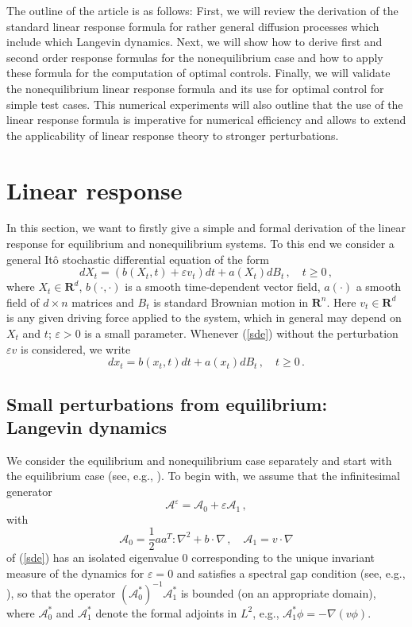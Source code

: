 \documentclass[]{tMPH2e}
\newcommand{\R}{{\mathbf R}}
\newcommand{\eps}{\varepsilon}
\newcommand{\fwg}{{\mathcal A}}
\newcommand{\cA}{\mathcal A}
\begin{document}
The outline of the article is as follows: First, we will review the derivation of the standard linear response formula for  rather general diffusion processes which include which Langevin dynamics. Next, we will show how to derive first and second order response formulas for the nonequilibrium case and how to apply these formula for the computation of optimal controls. Finally, we will validate the nonequilibrium linear response formula and its use for optimal control for simple test cases. This numerical experiments will also outline that the use of the linear response formula is imperative for numerical efficiency and allows to extend the applicability of linear response theory to stronger perturbations. 


 

\section{Linear response}


In this section, we want to firstly give a simple and formal derivation of the linear response for equilibrium and nonequilibrium systems. To this end we consider a general It\^o stochastic differential equation of the form
\begin{equation}\label{sde}
dX_{t} = (b(X_{t},t) + \eps v_{t})dt +a(X_{t})dB_{t}\,,\quad t\ge 0\,,
\end{equation}
where $X_{t}\in\R^{d}$, $b(\cdot,\cdot)$ is a smooth time-dependent vector field, $a(\cdot)$ a smooth field of $d\times n$ matrices and $B_{t}$ is standard Brownian motion in $\R^{n}$. Here $v_{t}\in\R^{d}$ is any given driving force applied to the system, which in general may depend on $X_{t}$ and $t$; $\eps>0$ is a small parameter. Whenever (\ref{sde}) without the perturbation $\eps v$ is considered, we write
\begin{equation}\label{sdewo}
dx_{t} = b(x_{t},t)dt +a(x_{t})dB_{t}\,,\quad t\ge 0\,. 
\end{equation}


  




\subsection{Small perturbations from equilibrium: Langevin dynamics}

We consider the equilibrium and nonequilibrium case separately and start with the equilibrium case (see, e.g., \cite{kubo1957,tuckeman2010statistical}). To begin with, we assume that the infinitesimal generator
\[
\fwg^{\eps} = \fwg_{0} + \eps\fwg_{1}\,, 
\]
with 
\[
\fwg_{0} = \frac{1}{2}aa^{T}\colon\nabla^{2} + b\cdot\nabla\,,\quad \fwg_{1}=v\cdot\nabla 
\]
of (\ref{sde}) has an isolated eigenvalue 0 corresponding to the unique invariant measure of the dynamics for $\eps=0$ and satisfies a spectral gap condition (see, e.g., \cite{stoltz2012}), so that the operator $(\fwg_{0}^{*})^{-1}\fwg_{1}^{*}$ is bounded (on an appropriate domain), where $\cA_{0}^{*}$ and $\cA_{1}^{*}$ denote the formal adjoints in $L^{2}$, e.g., $\cA_{1}^{*}\phi=-\nabla(v \phi)$.  
\end{document}
